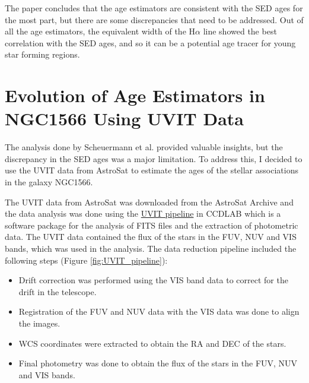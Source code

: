\documentclass[12pt]{report}
\begin{document}
The paper concludes that the age estimators are consistent with the SED ages for the most part, but there are some discrepancies that need to be addressed. Out of all the age estimators, the equivalent width of the H$\alpha$ line showed the best correlation with the SED ages, and so it can be a potential age tracer for young star forming regions. 

\section{Evolution of Age Estimators in NGC1566 Using UVIT Data}

The analysis done by Scheuermann et al. \cite{scheuermann2023stellar} provided valuable insights, but the discrepancy in the SED ages was a major limitation. To address this, I decided to use the UVIT data from AstroSat to estimate the ages of the stellar associations in the galaxy NGC1566. 

The UVIT data from AstroSat was downloaded from the AstroSat Archive and the data analysis was done using the \href{https://youtu.be/QyIfjwN4DK4?si=G0OCJarjRbgJhqsX}{UVIT pipeline}  in CCDLAB \cite{postma2017ccdlab} which is a software package for the analysis of FITS files and the extraction of photometric data. The UVIT data contained the flux of the stars in the FUV, NUV and VIS bands, which was used in the analysis. The data reduction pipeline included the following steps (Figure \ref{fig:UVIT_pipeline}):

\begin{itemize}
    \item Drift correction was performed using the VIS band data to correct for the drift in the telescope.
    \item Registration of the FUV and NUV data with the VIS data was done to align the images.
    \item WCS coordinates were extracted to obtain the RA and DEC of the stars.
    \item Final photometry was done to obtain the flux of the stars in the FUV, NUV and VIS bands.
\end{itemize}
\end{document}
